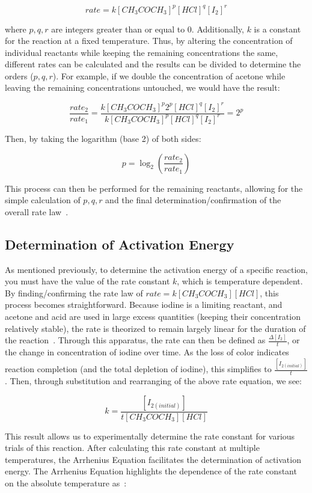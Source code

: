 \[rate = k[CH_3COCH_3]^p[HCl]^q[I_2]^r\]

where $p,q,r$ are integers greater than or equal to $0$. Additionally, $k$ is a constant for the reaction at a fixed temperature. Thus, by altering the concentration of individual reactants while keeping the remaining concentrations the same, different rates can be calculated and the results can be divided to determine the orders ($p,q,r$). For example, if we double the concentration of acetone while leaving the remaining concentrations untouched, we would have the result:

\[\frac{rate_2}{rate_1} = \frac{k[CH_3COCH_3]^p2^p[HCl]^q[I_2]^r}{k[CH_3COCH_3]^p[HCl]^q[I_2]^r} = 2^p\]

Then, by taking the logarithm (base 2) of both sides:

\[p = \log_2 \left(\frac{rate_2}{rate_1}\right)\]

This process can then be performed for the remaining reactants, allowing for the simple calculation of $p,q,r$ and the final determination/confirmation of the overall rate law~\parencite{intro_chemistry}.

\subsection{Determination of Activation Energy}
As mentioned previously, to determine the activation energy of a specific reaction, you must have the value of the rate constant $k$, which is temperature dependent. By finding/confirming the rate law of $rate = k[CH_3COCH_3][HCl]$, this process becomes straightforward. Because iodine is a limiting reactant, and acetone and acid are used in large excess quantities (keeping their concentration relatively stable), the rate is theorized to remain largely linear for the duration of the reaction~\parencite{other_literature_2}. Through this apparatus, the rate can then be defined as $\frac{\Delta [I_2]}{t}$, or the change in concentration of iodine over time. As the loss of color indicates reaction completion (and the total depletion of iodine), this simplifies to $\frac{[I_{2(initial)}]}{t}$. Then, through substitution and rearranging of the above rate equation, we see:

\[k = \frac{[I_{2(initial)}]}{t[CH_3COCH_3][HCl]}\]

This result allows us to experimentally determine the rate constant for various trials of this reaction. After calculating this rate constant at multiple temperatures, the Arrhenius Equation facilitates the determination of activation energy. The Arrhenius Equation highlights the dependence of the rate constant on the absolute temperature as~\parencite{arrhenius}:


